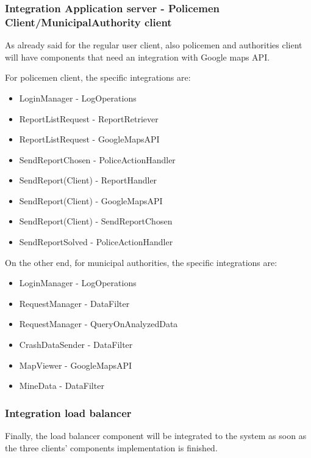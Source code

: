 \subsubsection{Integration Application server - Policemen Client/MunicipalAuthority client}
As already said for the regular user client, also policemen and authorities client will have components that need an integration with Google maps API. \\ \par
For policemen client, the specific integrations are:
\begin{itemize}
	\item LoginManager - LogOperations	
	\item ReportListRequest - ReportRetriever
	\item ReportListRequest - GoogleMapsAPI
	\item SendReportChosen - PoliceActionHandler
	\item SendReport(Client) - ReportHandler
	\item SendReport(Client) - GoogleMapsAPI
	\item SendReport(Client) - SendReportChosen
	\item SendReportSolved - PoliceActionHandler
\end{itemize}
On the other end, for municipal authorities, the specific integrations are:
\begin{itemize}
	\item LoginManager - LogOperations
	\item RequestManager - DataFilter
	\item RequestManager - QueryOnAnalyzedData
	\item CrashDataSender - DataFilter	
	\item MapViewer - GoogleMapsAPI
	\item MineData - DataFilter
\end{itemize}

\subsubsection{Integration load balancer}
Finally, the load balancer component will be integrated to the system as soon as the three clients' components implementation is finished.